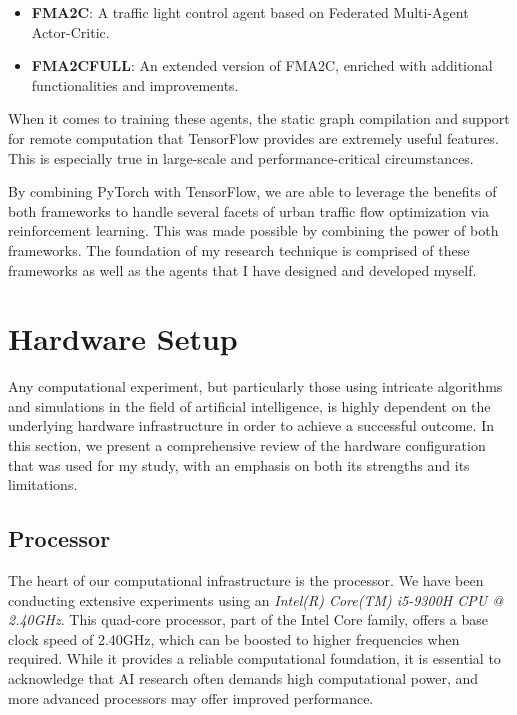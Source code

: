 \begin{itemize}
    \item \textbf{FMA2C}: A traffic light control agent based on Federated Multi-Agent Actor-Critic.
    
    \item \textbf{FMA2CFULL}: An extended version of FMA2C, enriched with additional functionalities and improvements.
\end{itemize}

When it comes to training these agents, the static graph compilation and support for remote computation that TensorFlow provides are extremely useful features. This is especially true in large-scale and performance-critical circumstances.

By combining PyTorch with TensorFlow, we are able to leverage the benefits of both frameworks to handle several facets of urban traffic flow optimization via reinforcement learning. This was made possible by combining the power of both frameworks. The foundation of my research technique is comprised of these frameworks as well as the agents that I have designed and developed myself.

\section{Hardware Setup}

Any computational experiment, but particularly those using intricate algorithms and simulations in the field of artificial intelligence, is highly dependent on the underlying hardware infrastructure in order to achieve a successful outcome. In this section, we present a comprehensive review of the hardware configuration that was used for my study, with an emphasis on both its strengths and its limitations.

\subsection{Processor}

The heart of our computational infrastructure is the processor. We have been conducting extensive experiments using an \textit{Intel(R) Core(TM) i5-9300H CPU @ 2.40GHz}. This quad-core processor, part of the Intel Core family, offers a base clock speed of 2.40GHz, which can be boosted to higher frequencies when required. While it provides a reliable computational foundation, it is essential to acknowledge that AI research often demands high computational power, and more advanced processors may offer improved performance.

